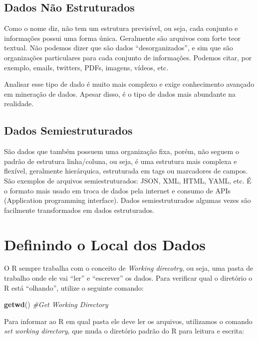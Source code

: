 \documentclass[]{book}
\newenvironment{Shaded}{\begin{snugshade}}{\end{snugshade}}
\newcommand{\KeywordTok}[1]{\textcolor[rgb]{0.13,0.29,0.53}{\textbf{#1}}}
\newcommand{\CommentTok}[1]{\textcolor[rgb]{0.56,0.35,0.01}{\textit{#1}}}
\newcommand{\NormalTok}[1]{#1}
\begin{document}
\subsection{Dados Não Estruturados}\label{dados-nao-estruturados}

Como o nome diz, não tem um estrutura previsível, ou seja, cada conjunto
e informações possui uma forma única. Geralmente são arquivos com forte
teor textual. Não podemos dizer que são dados ``desorganizados'', e sim
que são organizações particulares para cada conjunto de informações.
Podemos citar, por exemplo, emails, twitters, PDFs, imagens, vídeos,
etc.

Analisar esse tipo de dado é muito mais complexo e exige conhecimento
avançado em mineração de dados. Apesar disso, é o tipo de dados mais
abundante na realidade.

\subsection{Dados Semiestruturados}\label{dados-semiestruturados}

São dados que também possuem uma organização fixa, porém, não seguem o
padrão de estrutura linha/coluna, ou seja, é uma estrutura mais complexa
e flexível, geralmente hierárquica, estruturada em tags ou marcadores de
campos. São exemplos de arquivos semiestruturados: JSON, XML, HTML,
YAML, etc. É o formato mais usado em troca de dados pela internet e
consumo de APIs (Application programming interface). Dados
semiestruturados algumas vezes são facilmente transformados em dados
estruturados.

\section{Definindo o Local dos Dados}\label{definindo-o-local-dos-dados}

O R sempre trabalha com o conceito de \emph{Working direcotry}, ou seja,
uma pasta de trabalho onde ele vai ``ler'' e ``escrever'' os dados. Para
verificar qual o diretório o R está ``olhando'', utilize o seguinte
comando:

\begin{Shaded}
\begin{Highlighting}[]
\KeywordTok{getwd}\NormalTok{() }\CommentTok{#Get Working Directory}
\end{Highlighting}
\end{Shaded}

Para informar ao R em qual pasta ele deve ler os arquivos, utilizamos o
comando \emph{set working directory}, que muda o diretório padrão do R
para leitura e escrita:
\end{document}
